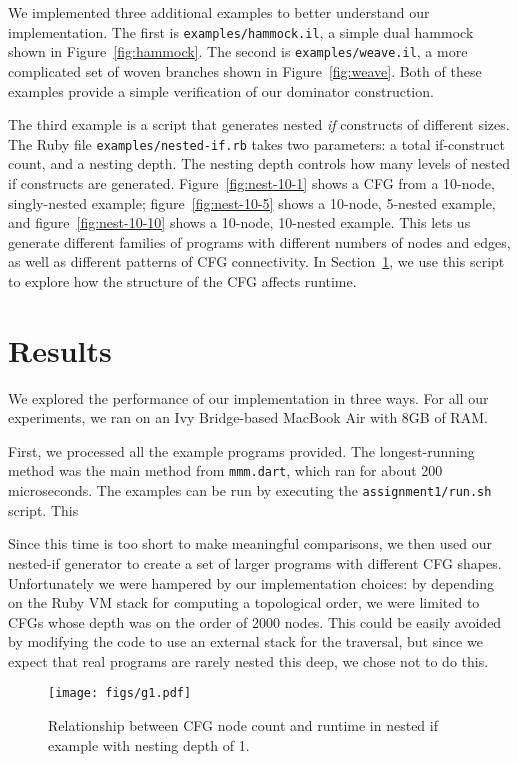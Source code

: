 \documentclass[10pt,twocolumn]{article}
\begin{document}
We implemented three additional examples to better understand our
implementation. The first is \texttt{examples/hammock.il}, a simple
dual hammock shown in Figure~\ref{fig:hammock}. The second is
\texttt{examples/weave.il}, a more complicated set of woven branches
shown in Figure~\ref{fig:weave}. Both of these examples provide a simple
verification of our dominator construction.

The third example is a script that generates nested {\it if}
constructs of different sizes. The Ruby file
\texttt{examples/nested-if.rb} takes two parameters: a total
if-construct count, and a nesting depth. The nesting depth controls
how many levels of nested if constructs are generated.
Figure~\ref{fig:nest-10-1} shows a CFG from a 10-node, singly-nested
example; figure~\ref{fig:nest-10-5} shows a 10-node, 5-nested example,
and figure~\ref{fig:nest-10-10} shows a 10-node, 10-nested
example. This lets us generate different families of programs with
different numbers of nodes and edges, as well as different patterns of
CFG connectivity. In Section~\ref{eval}, we use this script to explore
how the structure of the CFG affects runtime.

\section{Results}
\label{eval}


We explored the performance of our implementation in three ways. For
all our experiments, we ran on an Ivy Bridge-based MacBook Air with
8GB of RAM.

First, we processed all the example programs provided. The
longest-running method was the main method from \texttt{mmm.dart},
which ran for about 200 microseconds. The examples can be run by
executing the \texttt{assignment1/run.sh} script. This 

Since this time is too short to make meaningful comparisons, we then
used our nested-if generator to create a set of larger programs with
different CFG shapes. Unfortunately we were hampered by our
implementation choices: by depending on the Ruby VM stack for
computing a topological order, we were limited to CFGs whose depth was
on the order of 2000 nodes. This could be easily avoided by modifying
the code to use an external stack for the traversal, but since we
expect that real programs are rarely nested this deep, we chose not to
do this.


\begin{figure}
\begin{center}
  \texttt{[image: figs/g1.pdf]}
\begin{minipage}{0.95\columnwidth}
  \caption{\label{fig:nodes} Relationship between CFG node count and runtime in nested if example with nesting depth of 1.}
\end{minipage}
\end{center}
\end{figure}
\end{document}

